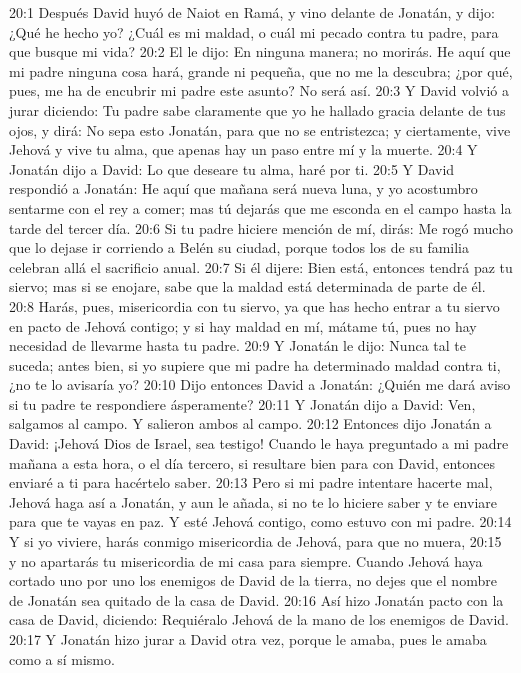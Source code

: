 20:1 Después David huyó de Naiot en Ramá, y vino delante de Jonatán, y dijo: ¿Qué he hecho yo? ¿Cuál es mi maldad, o cuál mi pecado contra tu padre, para que busque mi vida?  
20:2 El le dijo: En ninguna manera; no morirás. He aquí que mi padre ninguna cosa hará, grande ni pequeña, que no me la descubra; ¿por qué, pues, me ha de encubrir mi padre este asunto? No será así.  
20:3 Y David volvió a jurar diciendo: Tu padre sabe claramente que yo he hallado gracia delante de tus ojos, y dirá: No sepa esto Jonatán, para que no se entristezca; y ciertamente, vive Jehová y vive tu alma, que apenas hay un paso entre mí y la muerte.  
20:4 Y Jonatán dijo a David: Lo que deseare tu alma, haré por ti.  
20:5 Y David respondió a Jonatán: He aquí que mañana será nueva luna, y yo acostumbro sentarme con el rey a comer; mas tú dejarás que me esconda en el campo hasta la tarde del tercer día.  
20:6 Si tu padre hiciere mención de mí, dirás: Me rogó mucho que lo dejase ir corriendo a Belén su ciudad, porque todos los de su familia celebran allá el sacrificio anual.  
20:7 Si él dijere: Bien está, entonces tendrá paz tu siervo; mas si se enojare, sabe que la maldad está determinada de parte de él.  
20:8 Harás, pues, misericordia con tu siervo, ya que has hecho entrar a tu siervo en pacto de Jehová contigo; y si hay maldad en mí, mátame tú, pues no hay necesidad de llevarme hasta tu padre.  
20:9 Y Jonatán le dijo: Nunca tal te suceda; antes bien, si yo supiere que mi padre ha determinado maldad contra ti, ¿no te lo avisaría yo?  
20:10 Dijo entonces David a Jonatán: ¿Quién me dará aviso si tu padre te respondiere ásperamente?  
20:11 Y Jonatán dijo a David: Ven, salgamos al campo. Y salieron ambos al campo.  
20:12 Entonces dijo Jonatán a David: ¡Jehová Dios de Israel, sea testigo! Cuando le haya preguntado a mi padre mañana a esta hora, o el día tercero, si resultare bien para con David, entonces enviaré a ti para hacértelo saber.  
20:13 Pero si mi padre intentare hacerte mal, Jehová haga así a Jonatán, y aun le añada, si no te lo hiciere saber y te enviare para que te vayas en paz. Y esté Jehová contigo, como estuvo con mi padre.  
20:14 Y si yo viviere, harás conmigo misericordia de Jehová, para que no muera,  
20:15 y no apartarás tu misericordia de mi casa para siempre. Cuando Jehová haya cortado uno por uno los enemigos de David de la tierra, no dejes que el nombre de Jonatán sea quitado de la casa de David.  
20:16 Así hizo Jonatán pacto con la casa de David, diciendo: Requiéralo Jehová de la mano de los enemigos de David.  
20:17 Y Jonatán hizo jurar a David otra vez, porque le amaba, pues le amaba como a sí mismo.  
